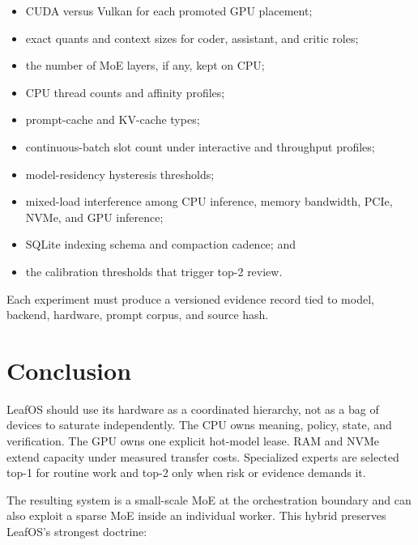 \documentclass[11pt,letterpaper]{article}
\begin{document}
\begin{itemize}
  \item CUDA versus Vulkan for each promoted GPU placement;
  \item exact quants and context sizes for coder, assistant, and critic roles;
  \item the number of MoE layers, if any, kept on CPU;
  \item CPU thread counts and affinity profiles;
  \item prompt-cache and KV-cache types;
  \item continuous-batch slot count under interactive and throughput profiles;
  \item model-residency hysteresis thresholds;
  \item mixed-load interference among CPU inference, memory bandwidth, PCIe,
        NVMe, and GPU inference;
  \item SQLite indexing schema and compaction cadence; and
  \item the calibration thresholds that trigger top-2 review.
\end{itemize}

Each experiment must produce a versioned evidence record tied to model, backend,
hardware, prompt corpus, and source hash.

\section{Conclusion}

LeafOS should use its hardware as a coordinated hierarchy, not as a bag of
devices to saturate independently. The CPU owns meaning, policy, state, and
verification. The GPU owns one explicit hot-model lease. RAM and NVMe extend
capacity under measured transfer costs. Specialized experts are selected
top-1 for routine work and top-2 only when risk or evidence demands it.

The resulting system is a small-scale MoE at the orchestration boundary and can
also exploit a sparse MoE inside an individual worker. This hybrid preserves
LeafOS's strongest doctrine:

\begin{center}
\end{center}
\end{document}
